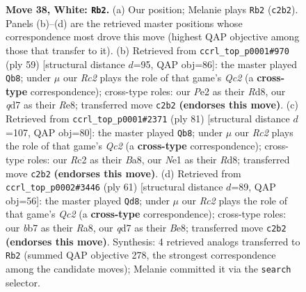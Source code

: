 \documentclass[11pt]{article}
\begin{document}
\begin{figure}[p]
\caption{\textbf{Move 38, White: \texttt{Rb2}.} (a) Our position; Melanie plays \texttt{Rb2} (\texttt{c2b2}). Panels (b)--(d) are the retrieved master positions whose correspondence most drove this move (highest QAP objective among those that transfer to it). (b) Retrieved from \texttt{ccrl\_top\_p0001\#970} (ply 59) [structural distance $d$=95, QAP obj=86]: the master played \texttt{Qb8}; under $\mu$ our \emph{Rc2} plays the role of that game's \emph{Qc2} (a \textbf{cross-type} correspondence); cross-type roles: our \emph{P}e2 as their \emph{R}d8, our \emph{q}d7 as their \emph{R}e8; transferred move \texttt{c2b2} \textbf{(endorses this move)}. (c) Retrieved from \texttt{ccrl\_top\_p0001\#2371} (ply 81) [structural distance $d$=107, QAP obj=80]: the master played \texttt{Qb8}; under $\mu$ our \emph{Rc2} plays the role of that game's \emph{Qc2} (a \textbf{cross-type} correspondence); cross-type roles: our \emph{R}c2 as their \emph{B}a8, our \emph{N}e1 as their \emph{R}d8; transferred move \texttt{c2b2} \textbf{(endorses this move)}. (d) Retrieved from \texttt{ccrl\_top\_p0002\#3446} (ply 61) [structural distance $d$=89, QAP obj=56]: the master played \texttt{Qd8}; under $\mu$ our \emph{Rc2} plays the role of that game's \emph{Qc2} (a \textbf{cross-type} correspondence); cross-type roles: our \emph{b}b7 as their \emph{R}a8, our \emph{q}d7 as their \emph{B}e8; transferred move \texttt{c2b2} \textbf{(endorses this move)}. Synthesis: 4 retrieved analogs transferred to \texttt{Rb2} (summed QAP objective 278, the strongest correspondence among the candidate moves); Melanie committed it via the \texttt{search} selector.}
\label{fig:thought-m74}
\end{figure}

\clearpage
\end{document}
